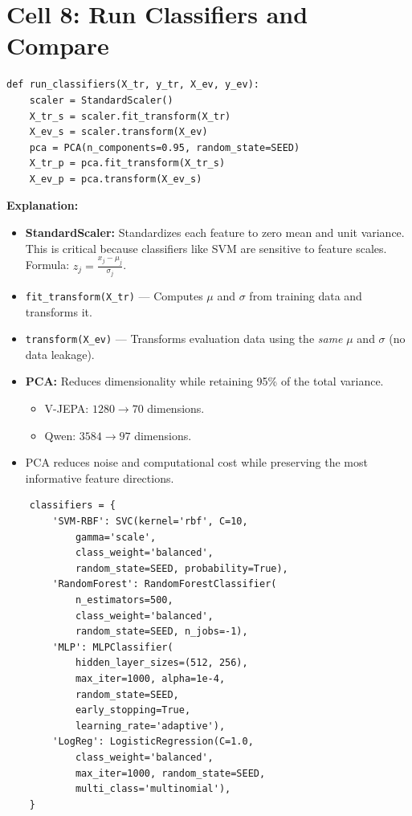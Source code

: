 \documentclass[a4paper, 12pt]{article}
\newenvironment{explanation}{%
  \par\smallskip
  \noindent\textcolor{blue!70!black}{\textbf{Explanation:}}\\
  \noindent
}{\par\medskip}
\begin{document}
\newpage
\section{Cell 8: Run Classifiers and Compare}

\begin{lstlisting}
def run_classifiers(X_tr, y_tr, X_ev, y_ev):
    scaler = StandardScaler()
    X_tr_s = scaler.fit_transform(X_tr)
    X_ev_s = scaler.transform(X_ev)
    pca = PCA(n_components=0.95, random_state=SEED)
    X_tr_p = pca.fit_transform(X_tr_s)
    X_ev_p = pca.transform(X_ev_s)
\end{lstlisting}

\begin{explanation}
\begin{itemize}[nosep]
  \item \textbf{StandardScaler:} Standardizes each feature to zero mean and unit variance. This is critical because classifiers like SVM are sensitive to feature scales. Formula: $z_j = \frac{x_j - \mu_j}{\sigma_j}$.
  \item \texttt{fit\_transform(X\_tr)} --- Computes $\mu$ and $\sigma$ from training data and transforms it.
  \item \texttt{transform(X\_ev)} --- Transforms evaluation data using the \textit{same} $\mu$ and $\sigma$ (no data leakage).
  \item \textbf{PCA:} Reduces dimensionality while retaining 95\% of the total variance.
  \begin{itemize}[nosep]
    \item V-JEPA: $1280 \rightarrow 70$ dimensions.
    \item Qwen: $3584 \rightarrow 97$ dimensions.
  \end{itemize}
  \item PCA reduces noise and computational cost while preserving the most informative feature directions.
\end{itemize}
\end{explanation}

\begin{lstlisting}
    classifiers = {
        'SVM-RBF': SVC(kernel='rbf', C=10,
            gamma='scale',
            class_weight='balanced',
            random_state=SEED, probability=True),
        'RandomForest': RandomForestClassifier(
            n_estimators=500,
            class_weight='balanced',
            random_state=SEED, n_jobs=-1),
        'MLP': MLPClassifier(
            hidden_layer_sizes=(512, 256),
            max_iter=1000, alpha=1e-4,
            random_state=SEED,
            early_stopping=True,
            learning_rate='adaptive'),
        'LogReg': LogisticRegression(C=1.0,
            class_weight='balanced',
            max_iter=1000, random_state=SEED,
            multi_class='multinomial'),
    }
\end{lstlisting}
\end{document}
